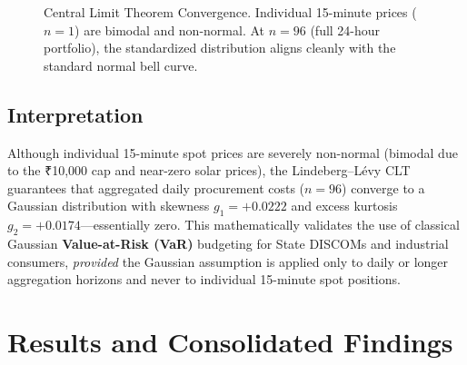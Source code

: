 \documentclass[12pt, a4paper]{article}
\theoremstyle{definition}
\begin{document}
\begin{figure}[H]
    \centering
    \caption{Central Limit Theorem Convergence. Individual 15-minute prices ($n=1$) are bimodal and non-normal. At $n=96$ (full 24-hour portfolio), the standardized distribution aligns cleanly with the standard normal bell curve.}
    \label{fig:clt}
\end{figure}

\subsection{Interpretation}

Although individual 15-minute spot prices are severely non-normal (bimodal due to the ₹10,000 cap and near-zero solar prices), the Lindeberg--L\'{e}vy CLT guarantees that aggregated daily procurement costs ($n = 96$) converge to a Gaussian distribution with skewness $g_1 = +0.0222$ and excess kurtosis $g_2 = +0.0174$---essentially zero. This mathematically validates the use of classical Gaussian \textbf{Value-at-Risk (VaR)} budgeting for State DISCOMs and industrial consumers, \emph{provided} the Gaussian assumption is applied only to daily or longer aggregation horizons and never to individual 15-minute spot positions.

\section{Results and Consolidated Findings}
\end{document}
